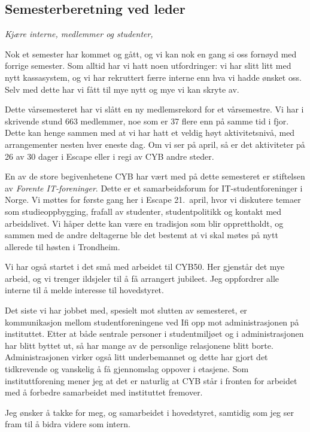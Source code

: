 \documentclass[10pt,norsk,a4paper]{article}
\begin{document}
\subsection{Semesterberetning ved leder}
\textit{Kjære interne, medlemmer og studenter,}
\begin{multicols}{2}
Nok et semester har kommet og gått, og vi kan nok en gang si oss fornøyd med forrige semester. Som alltid
har vi hatt noen utfordringer: vi har slitt litt med nytt kassasystem, og vi har rekruttert færre interne enn hva vi hadde ønsket oss. Selv med dette har vi fått til mye nytt og mye vi kan skryte av.

Dette vårsemesteret har vi slått en ny medlemsrekord for et vårsemestre. Vi har i skrivende stund 663
medlemmer, noe som er 37 flere enn på samme tid i fjor. Dette kan henge sammen med at vi har hatt et veldig høyt aktivitetsnivå, med arrangementer nesten hver eneste dag. Om vi ser på april, så er det aktiviteter på 26 av 30 dager i Escape eller i regi av CYB andre steder.

En av de store begivenhetene CYB har vært med på dette semesteret er stiftelsen av \textit{Forente IT-foreninger}. Dette er et samarbeidsforum for IT-studentforeninger i Norge. Vi møttes for første gang her i Escape 21.\ april, hvor vi diskutere temaer som studieoppbygging, frafall av studenter, studentpolitikk og kontakt med arbeidslivet. Vi håper dette kan være en tradisjon som blir opprettholdt, og sammen med de andre deltagerne ble det bestemt at vi skal møtes på nytt allerede til høsten i Trondheim.

Vi har også startet i det små med arbeidet til CYB50. Her gjenstår det mye arbeid, og vi trenger ildsjeler til å få arrangert jubileet. Jeg oppfordrer alle interne til å melde interesse til hovedstyret.

Det siste vi har jobbet med, spesielt mot slutten av semesteret, er kommunikasjon mellom studentforeningene ved Ifi opp mot administrasjonen på instituttet. Etter at både sentrale personer i studentmiljøet og i administrasjonen har blitt byttet ut, så har mange av de personlige relasjonene blitt borte. Administrasjonen virker også litt underbemannet og dette har gjort det tidkrevende og vanskelig å få gjennomslag oppover i etasjene. Som instituttforening mener jeg at det er naturlig at CYB står i fronten for arbeidet med å forbedre samarbeidet med instituttet fremover. 

\end{multicols}

Jeg ønsker å takke for meg, og samarbeidet i hovedstyret, samtidig som jeg ser fram til å bidra videre som intern.
\end{document}
